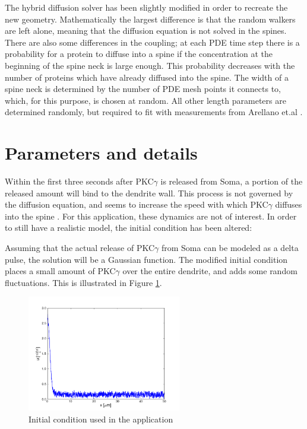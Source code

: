 The hybrid diffusion solver has been slightly modified in order to recreate the new geometry. 
Mathematically the largest difference is that the random walkers are left alone, meaning that the diffusion equation is not solved in the spines. 
There are also some differences in the coupling; at each PDE time step there is a probability for a protein to diffuse into a spine if the concentration at the beginning of the spine neck is large enough. This probability decreases with the number of proteins which have already diffused into the spine. 
The width of a spine neck is determined by the number of PDE mesh points it connects to, which, for this purpose, is chosen at random. 
All other length parameters are determined randomly, but required to fit with measurements from Arellano et.al \cite{arellano2007ultrastructure}. 

\section{Parameters and details}
Within the first three seconds after PKC$\gamma$ is released from Soma, a portion of the released amount will bind to the dendrite wall. 
This process is not governed by the diffusion equation, and seems to increase the speed with which PKC$\gamma$ diffuses into the spine \cite{craske2005spines}. 
For this application, these dynamics are not of interest. In order to still have a realistic model, the initial condition has been altered: 

Assuming that the actual release of PKC$\gamma$ from Soma can be modeled as a delta pulse, the solution will be a Gaussian function. 
The modified initial condition places a small amount of PKC$\gamma$ over the entire dendrite, and adds some random fluctuations. This is illustrated in Figure \ref{initial}. 
\begin{figure}[H]
 \centering
 \includegraphics[width=0.6\textwidth]{Figures/initial_condition_application.png}
 \caption{Initial condition used in the application}
 \label{initial}
\end{figure}

